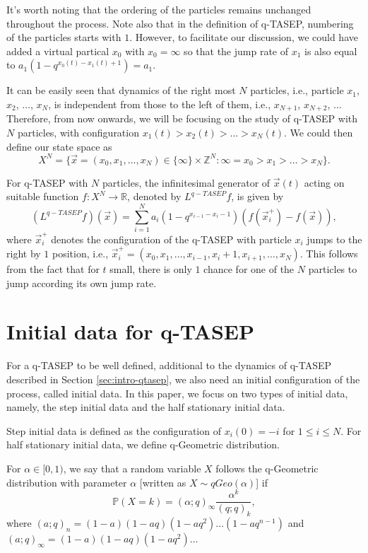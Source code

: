 It's worth noting that the ordering of the particles remains unchanged throughout the process. Note also that in the definition of q-TASEP, numbering of the particles starts with $1$. However, to facilitate our discussion, we could have added a virtual partical $x_0$ with $x_0 = \infty$ so that the jump rate of $x_1$ is also equal to $a_1 (1-q^{x_0(t) - x_1(t) + 1}) = a_1$. 

It can be easily seen that dynamics of the right most $N$ particles, i.e., particle $x_1$, $x_2$, $\dots$, $x_N$, is independent from those to the left of them, i.e., $x_{N+1}$, $x_{N+2}$, $\dots$ Therefore, from now onwards, we will be focusing on the study of q-TASEP with $N$ particles, with configuration $x_1(t) > x_2(t) > \dots > x_N(t)$. We could then define our state space as $$X^N = \{\vec{x}=(x_0,x_1,\dots, x_N) \in \{\infty \} \times \mathbb{Z}^N : \infty = x_0 > x_1 > \dots > x_N \}.$$

For q-TASEP with $N$ particles, the infinitesimal generator of $\vec{x}(t)$ acting on suitable function $f: X^N \rightarrow \mathbb{R}$, denoted by $L^{q-TASEP} f$, is given by $$(L^{q-TASEP} f) (\vec{x}) = \sum_{i=1}^{N} a_i (1-q^{x_{i-1} - x_i - 1}) (f(\vec{x}_i^{+}) - f(\vec{x})),$$ where $\vec{x}_i^{+}$ denotes the configuration of the q-TASEP with particle $x_i$ jumps to the right by $1$ position, i.e., $\vec{x}_i^+ = (x_0, x_1, \dots, x_{i-1}, x_i+1, x_{i+1}, \dots, x_N)$. This follows from the fact that for $t$ small, there is only $1$ chance for one of the $N$ particles to jump according its own jump rate.

\section{Initial data for q-TASEP}
For a q-TASEP to be well defined, additional to the dynamics of q-TASEP described in Section \ref{sec:intro-qtasep}, we also need an initial configuration of the process, called initial data. In this paper, we focus on two types of initial data, namely, the step initial data and the half stationary initial data. 

Step initial data is defined as the configuration of $x_i(0) = -i$ for $1 \le i \le N$. For half stationary initial data, we define q-Geometric distribution. 

\begin{definition}
\label{def:qgeo}
For $\alpha \in [0,1)$, we say that a random variable $X$ follows the q-Geometric distribution with parameter $\alpha$ [written as $X \sim qGeo(\alpha)$] if $$\mathbb{P}(X = k) = (\alpha;q)_{\infty} \frac{\alpha^k}{(q;q)_k},$$ where $(a;q)_n = (1-a)(1-aq)(1-aq^2)\dots(1-aq^{n-1})$ and $(a;q)_{\infty} = (1-a)(1-aq)(1-aq^2)\dots$
\end{definition}

